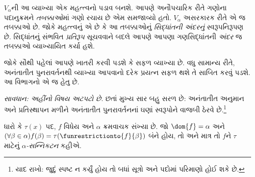 $V_\alpha$ની આ વ્યાખ્યા એક મહત્ત્વનો પડાવ બનશે. આપણે અનૌપચારિક
રીતે ગણોના પદાનુક્રમને \emph{તબક્કાઓ}માં ગણો રચાય છે એમ
સમજાવ્યો હતો. $V_\alpha$ અસરકારક રીતે એ જ તબક્કાઓ છે. જોકે
મહત્ત્વનું એ છે કે આ તબક્કાઓનું \emph{સિદ્ધાંતની અંદરનું}
સ્વરૂપનિરૂપણ છે. સિદ્ધાંતનું સંભવિત \emph{પ્રતિરૂપ} સૂચવવાને
બદલે આપણે આપણા ગણસિદ્ધાંતની \emph{અંદર} જ તબક્કાઓ
વ્યાખ્યાયિત કર્યા હશે.
\endgroup

\begingroup
\makeatletter{}\makeatother

\label{guunit:OLP-0560}


જોકે સૌથી પહેલાં આપણે ખાતરી કરવી પડશે કે
 સફળ વ્યાખ્યા છે. વધુ સામાન્ય રીતે,
અનંતાતીત પુનરાવર્તનથી વ્યાખ્યા આપવાનો દરેક પ્રયત્ન સફળ થશે તે
સાબિત કરવું પડશે. આ વિભાગનો એ જ હેતુ છે.

\emph{સાવધાન: અહીંનો વિષય અટપટો છે}. છતાં મુખ્ય સાર બહુ સરળ છે:
અનંતાતીત અનુમાન અને પ્રતિસ્થાપન મળીને અનંતાતીત પુનરાવર્તનનાં
ઘણાં સ્વરૂપોને વાજબી ઠેરવે છે.\footnote{યાદ રાખો: જુદું સ્પષ્ટ ન
કર્યું હોય તો બધાં સૂત્રો અને પદોમાં પરિમાણો હોઈ શકે છે.}

\begin{defn}
	ધારો કે $\tau(x)$ પદ, $f$ વિધેય અને $\alpha$ ક્રમવાચક સંખ્યા છે.
	જો $\dom{f} = \alpha$ અને $(\forall \beta \in \alpha)f(\beta) = \tau(\funrestrictionto{f}{\beta})$ બંને હોય,
	તો અને માત્ર તો $f$ને $\tau$ માટેનું \emph{$\alpha$-સન્નિકટન} કહીએ.
\end{defn}

